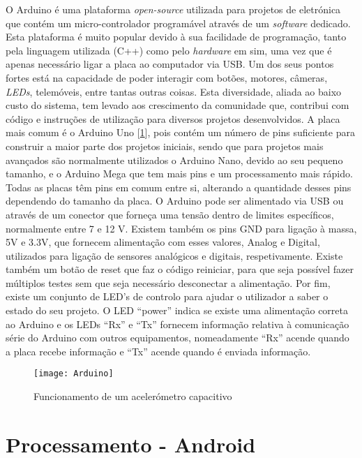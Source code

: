 O Arduino é uma plataforma \emph{open-source} utilizada  para projetos de eletrónica que contém um micro-controlador programável através de um \emph{software} dedicado.
Esta plataforma é muito popular devido à sua facilidade de programação, tanto pela linguagem utilizada (C++) como pelo \emph{hardware} em sim, uma vez que é apenas necessário ligar a placa ao computador via USB.
Um dos seus pontos fortes está na capacidade de poder interagir com botões, motores, câmeras, \emph{LEDs}, telemóveis, entre tantas outras coisas.
Esta diversidade, aliada  ao baixo custo do sistema, tem levado aos crescimento da comunidade que, contribui com código e instruções de utilização para diversos projetos desenvolvidos.
A placa mais comum é o Arduino Uno [\ref{fig:arduino}], pois contém um número de pins suficiente para construir a maior parte dos projetos iniciais, sendo que para projetos mais avançados são normalmente utilizados o Arduino Nano, devido ao seu pequeno tamanho, e o Arduino Mega que tem mais pins e um processamento mais rápido.
Todas as placas têm pins em comum entre si, alterando a quantidade desses pins dependendo do tamanho da placa.
O Arduino pode ser alimentado via USB ou através de um conector que forneça uma tensão dentro de limites específicos, normalmente entre 7 e 12 V.
Existem também os pins GND para ligação à massa, 5V e 3.3V, que fornecem alimentação com esses valores, Analog e Digital, utilizados para ligação de sensores analógicos e digitais, respetivamente.
Existe também um botão de reset que faz o código reiniciar, para que seja possível fazer múltiplos testes sem que seja necessário desconectar a alimentação.
Por fim, existe um conjunto de LED's de controlo para ajudar o utilizador a saber o estado do seu projeto.
O LED ``power'' indica se existe uma alimentação correta ao Arduino e os LEDs ``Rx'' e ``Tx'' fornecem informação relativa à comunicação série do Arduino com outros equipamentos, nomeadamente ``Rx'' acende quando a placa recebe informação e ``Tx'' acende quando é enviada informação.

\begin{figure}[hbtp]
	\centering
	\texttt{[image: Arduino]}
	\caption[Funcionamento de um acelerómetro capacitivo]{Funcionamento de um acelerómetro capacitivo \footnotemark}
	\label{fig:arduino}
\end{figure}

\section{Processamento - Android}
\label{sec:android}

